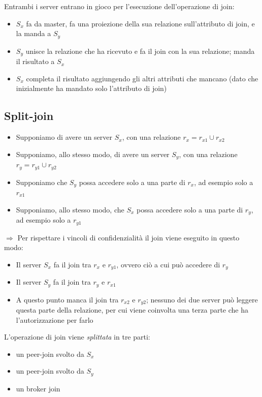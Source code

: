 \documentclass{report}
\begin{document}
Entrambi i server entrano in gioco per l'esecuzione dell'operazione di join: 
\begin{itemize}
    \item $S_x$ fa da master, fa una proiezione della sua relazione sull'attributo di join, e la manda a $S_y$
    \item $S_y$ unisce la relazione che ha ricevuto e fa il join con la sua relazione; manda il risultato a $S_x$
    \item $S_x$ completa il risultato aggiungendo gli altri attributi che mancano (dato che inizialmente ha mandato solo l'attributo di join)
\end{itemize}

\subsection{Split-join}

\begin{itemize}
    \item Supponiamo di avere un server $S_x$, con una relazione $r_x = r_{x1} \cup r_{x2}$
    \item Supponiamo, allo stesso modo, di  avere un server $S_y$, con una relazione $r_y = r_{y1} \cup r_{y2}$
    \item Supponiamo che $S_y$ possa accedere solo a una parte di $r_x$, ad esempio solo a $r_{x1}$
    \item Supponiamo, allo stesso modo, che $S_x$ possa accedere solo a una parte di $r_y$, ad esempio solo a $r_{y1}$
\end{itemize}

\noindent $\Rightarrow$ Per rispettare i vincoli di confidenzialità il join viene eseguito in questo modo:
\begin{itemize}
    \item Il server $S_x$ fa il join tra $r_x$ e $r_{y1}$, ovvero ciò a cui può accedere di $r_y$
    \item Il server $S_y$ fa il join tra $r_y$ e $r_{x1}$
    \item A questo punto manca il join tra $r_{x2}$ e $r_{y2}$; nessuno dei due server può leggere 
    questa parte della relazione, per cui viene coinvolta una terza parte che ha l'autorizzazione per farlo 
\end{itemize}

\newpage
\noindent L'operazione di join viene \textit{splittata} in tre parti:
\begin{itemize}
    \item un peer-join svolto da $S_x$
    \item un peer-join svolto da $S_y$
    \item un broker join
\end{itemize}
 
\end{document}
